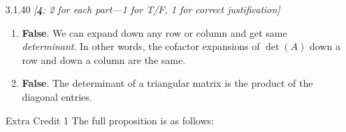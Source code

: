 \documentclass{amsart}
\theoremstyle{definition}
\theoremstyle{definition}
\DeclareMathOperator{\1}{\mathbbm{1}}
\begin{document}
\begin{enumerate}[itemsep = 2mm]
		\item[3.1.40]  \textit{[\textbf{4}; 2 for each part---1 for T/F, 1 for correct justification]}
		
		\begin{enumerate}
			\item \textbf{False}. We can expand down any row or column and get same \textit{determinant}. In other words, the cofactor expansions of $\det(A)$ down a row and down a column are the same.
			
			
			\item \textbf{False}. The determinant of a triangular matrix is the product of the diagonal entries.
		\end{enumerate}
		
		\clearpage
		
		\item[Extra Credit 1] The full proposition is as follows:
		

\end{enumerate}
\end{document}
